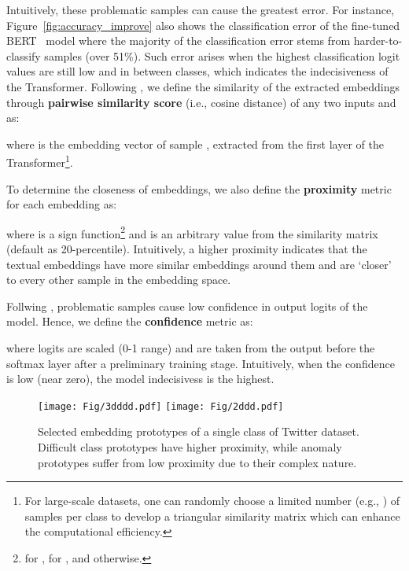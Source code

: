 \documentclass[letterpaper]{article} \usepackage{aaai22}  \usepackage{times}  \usepackage{helvet}  \usepackage{courier}  \usepackage{amsmath,amssymb}
\begin{document}
Intuitively, these problematic samples can cause the greatest error.
For instance, Figure~\ref{fig:accuracy_improve} also shows the classification error of the fine-tuned BERT~\cite{devlin2018bert} model where the majority of the classification error stems from harder-to-classify samples (over 51\%).
Such error arises when the highest classification logit values are still low and in between classes, which indicates the indecisiveness of the Transformer. 
Following \cite{han2019noisy}, we define the similarity of the extracted embeddings through {\bf pairwise similarity score} (i.e., cosine distance) of any two inputs  and  as:

where  is the embedding vector of sample , extracted from the first layer of the Transformer\footnote{For large-scale datasets, one can randomly choose a limited number
(e.g., ) 
of samples per class to develop a triangular similarity matrix  which can enhance the computational efficiency.}. 


To determine the closeness of embeddings, we also define the {\bf proximity} metric  for each embedding as:

where  is a sign function\footnote{ for ,  for , and  otherwise.} 
and  is an arbitrary value from the similarity matrix (default as 20-percentile).
Intuitively, a higher proximity indicates that the textual embeddings have more similar embeddings around them and are `closer' to every other sample in the embedding space.


Follwing \cite{pleiss2020noisyAUM}, problematic samples cause low confidence in output logits of the model. Hence, we define the \textbf{confidence} metric  as:

where logits are scaled (0-1 range) and are taken from the output before the softmax layer after a preliminary training stage. 
Intuitively, when the confidence is low (near zero), the model indecisivess is the highest.
\begin{figure}[!t]\centering\offinterlineskip
{{\texttt{[image: Fig/3dddd.pdf]}}}\qquad
 {{\texttt{[image: Fig/2ddd.pdf]} }}\caption{Selected embedding prototypes of a single class of Twitter dataset. Difficult class prototypes have higher proximity, while anomaly prototypes suffer from low proximity due to their complex nature.}\label{fig:protype_selection}
\end{figure}
\end{document}
